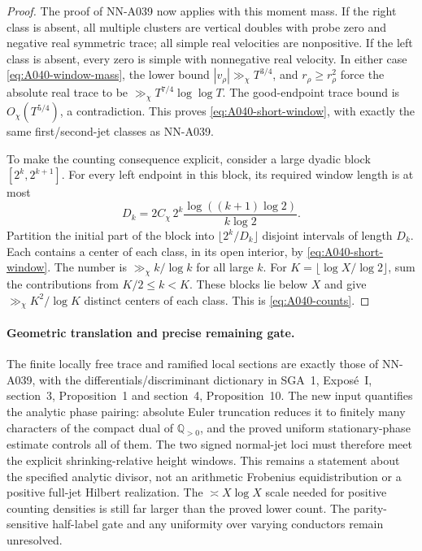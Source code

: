 \begin{proof}
The proof of NN-A039 now applies with this moment mass.
If the right class is absent, all multiple clusters are vertical
doubles with probe zero and negative real symmetric trace;
all simple real velocities are nonpositive. If the left class
is absent, every zero is simple with nonnegative real velocity.
In either case \eqref{eq:A040-window-mass}, the lower bound
$|v_\rho|\gg_\chi T^{3/4}$, and $r_\rho\ge r_\rho^2$
force the absolute real trace to be
$\gg_\chi T^{7/4}\log\log T$. The good-endpoint trace bound
is $O_\chi(T^{5/4})$, a contradiction. This proves
\eqref{eq:A040-short-window}, with exactly the same
first/second-jet classes as NN-A039.

To make the counting consequence explicit, consider a large
dyadic block $[2^k,2^{k+1}]$. For every left endpoint in this
block, its required window length is at most
\[
 D_k=2C_\chi\,2^k
            \frac{\log((k+1)\log2)}{k\log2}.
\]
Partition the initial part of the block into
$\lfloor2^k/D_k\rfloor$ disjoint intervals of length $D_k$.
Each contains a center of each class, in its open interior,
by \eqref{eq:A040-short-window}. The number is
$\gg_\chi k/\log k$ for all large $k$.
For $K=\lfloor\log X/\log2\rfloor$, sum the contributions
from $K/2\le k<K$. These blocks lie below $X$ and give
$\gg_\chi K^2/\log K$ distinct centers of each class.
This is \eqref{eq:A040-counts}.
\end{proof}

\paragraph{Geometric translation and precise remaining gate.}
The finite locally free trace and ramified local sections are exactly
those of NN-A039, with the differentials/discriminant dictionary in
SGA~1, Expos\'e~I, section~3, Proposition~1 and section~4,
Proposition~10. The new input quantifies the analytic phase pairing:
absolute Euler truncation reduces it to finitely many characters
of the compact dual of $\mathbb Q_{>0}$, and the proved uniform
stationary-phase estimate controls all of them. The two signed
normal-jet loci must therefore meet the explicit shrinking-relative
height windows. This remains a statement about the specified
analytic divisor, not an arithmetic Frobenius equidistribution or
a positive full-jet Hilbert realization. The $\asymp X\log X$
scale needed for positive counting densities is still far larger
than the proved lower count. The parity-sensitive half-label gate
and any uniformity over varying conductors remain unresolved.


